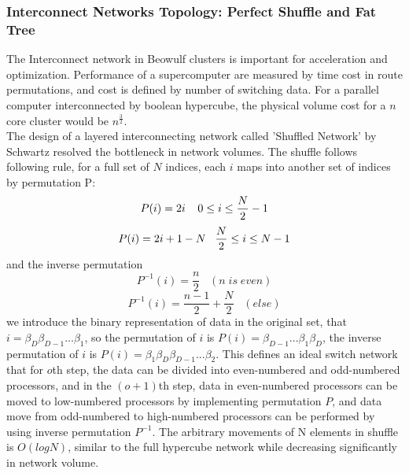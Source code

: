 \documentclass[11pt,openright,a4paper]{report}
\begin{document}
\subsubsection{Interconnect Networks Topology: Perfect Shuffle and Fat Tree}
The Interconnect network in Beowulf clusters is important for acceleration and optimization. Performance of a supercomputer are measured by time cost in route permutations, and cost is defined by number of switching data\cite{leiserson1985fat}. For a parallel computer interconnected by boolean hypercube, the physical volume cost for a $n$ core cluster would be $n^{\frac{3}{2}}$. \\
The design of a layered interconnecting network called 'Shuffled Network' by Schwartz resolved the bottleneck in network volumes\cite{stone1971parallel}. The shuffle follows following rule, for a full set of $N$ indices, each $i$ maps into another set of indices by permutation P: \\
\begin{equation}
\label{equa:2}
P(i)=2i\; \; \; \; 0\leq i \leq \frac{N}{2}-1\\
\end{equation}
\begin{equation}
\label{equa:3}
P(i)=2i+1-N\; \; \; \frac{N}{2}\leq i \leq N-1\\
\end{equation}
and the inverse permutation 
\begin{equation}
\label{equa:4}
P^{-1}(i)=\frac{n}{2}\; \; \; (n\; is\; even)
\end{equation}
\begin{equation}
\label{equa:5}
P^{-1}(i)=\frac{n-1}{2}+\frac{N}{2}\; \; \; (else)
\end{equation}
we introduce the binary representation of data in the original set, that $i=\beta_{D}\beta_{D-1}...\beta_{1}$, so the permutation of $i$ is $P(i)=\beta_{D-1}...\beta_{1}\beta_{D}$, the inverse permutation of $i$ is $P(i)=\beta_{1}\beta_{D}\beta_{D-1}...\beta_{2}$. This defines an ideal switch network that for $o$th step, the data can be divided into even-numbered and odd-numbered processors, and in the $(o+1)$th step, data in even-numbered processors can be moved to low-numbered processors by implementing permutation $P$, and data move from odd-numbered to high-numbered processors can be performed by using inverse permutation $P^{-1}$\cite{schwartz1980ultracomputers}. The arbitrary movements of N elements in shuffle is $O(logN)$, similar to the full hypercube network while decreasing significantly in network volume\cite{clos1953study}.\\
\end{document}
